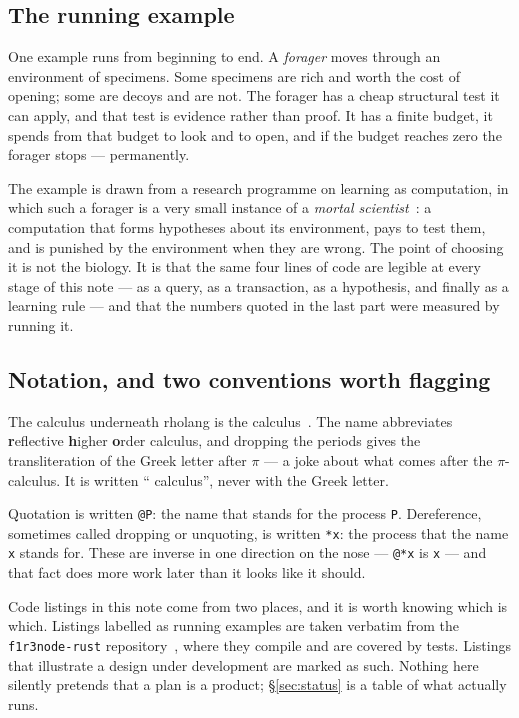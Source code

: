 \subsection{The running example}

One example runs from beginning to end. A \emph{forager} moves through an
environment of specimens. Some specimens are rich and worth the cost of opening;
some are decoys and are not. The forager has a cheap structural test it can
apply, and that test is evidence rather than proof. It has a finite budget, it
spends from that budget to look and to open, and if the budget reaches zero the
forager stops --- permanently.

The example is drawn from a research programme on learning as computation, in
which such a forager is a very small instance of a \emph{mortal
scientist}~\cite{ScientistNote}: a
computation that forms hypotheses about its environment, pays to test them, and
is punished by the environment when they are wrong. The point of choosing it is
not the biology. It is that the same four lines of code are legible at every
stage of this note --- as a query, as a transaction, as a hypothesis, and
finally as a learning rule --- and that the numbers quoted in the last part were
measured by running it.

\subsection{Notation, and two conventions worth flagging}

The calculus underneath rholang is the \rhoc{} calculus~\cite{MR05}. The name abbreviates
\textbf{r}eflective \textbf{h}igher \textbf{o}rder calculus, and dropping the
periods gives the transliteration of the Greek letter after $\pi$ --- a joke
about what comes after the $\pi$-calculus. It is written ``\rhoc{} calculus'',
never with the Greek letter.

Quotation is written \texttt{@P}: the name that stands for the process
\texttt{P}. Dereference, sometimes called dropping or unquoting, is written
\texttt{*x}: the process that the name \texttt{x} stands for. These are inverse
in one direction on the nose --- \texttt{@*x} is \texttt{x} --- and that fact
does more work later than it looks like it should.

Code listings in this note come from two places, and it is worth knowing which
is which. Listings labelled as running examples are taken verbatim from the
\texttt{f1r3node-rust} repository~\cite{f1r3node}, where they compile and are covered by tests.
Listings that illustrate a design under development are marked as such. Nothing
here silently pretends that a plan is a product; \S\ref{sec:status} is a table
of what actually runs.
